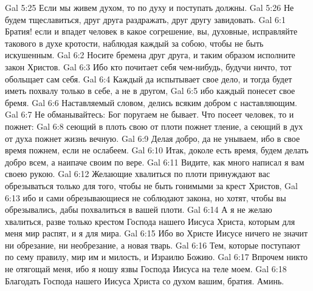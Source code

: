 Gal 5:25  Если мы живем духом, то по духу и поступать должны.
Gal 5:26  Не будем тщеславиться, друг друга раздражать, друг другу завидовать.
Gal 6:1  Братия! если и впадет человек в какое согрешение, вы, духовные, исправляйте такового в духе кротости, наблюдая каждый за собою, чтобы не быть искушенным.
Gal 6:2  Носите бремена друг друга, и таким образом исполните закон Христов.
Gal 6:3  Ибо кто почитает себя чем-нибудь, будучи ничто, тот обольщает сам себя.
Gal 6:4  Каждый да испытывает свое дело, и тогда будет иметь похвалу только в себе, а не в другом,
Gal 6:5  ибо каждый понесет свое бремя.
Gal 6:6  Наставляемый словом, делись всяким добром с наставляющим.
Gal 6:7  Не обманывайтесь: Бог поругаем не бывает. Что посеет человек, то и пожнет:
Gal 6:8  сеющий в плоть свою от плоти пожнет тление, а сеющий в дух от духа пожнет жизнь вечную.
Gal 6:9  Делая добро, да не унываем, ибо в свое время пожнем, если не ослабеем.
Gal 6:10  Итак, доколе есть время, будем делать добро всем, а наипаче своим по вере.
Gal 6:11  Видите, как много написал я вам своею рукою.
Gal 6:12  Желающие хвалиться по плоти принуждают вас обрезываться только для того, чтобы не быть гонимыми за крест Христов,
Gal 6:13  ибо и сами обрезывающиеся не соблюдают закона, но хотят, чтобы вы обрезывались, дабы похвалиться в вашей плоти.
Gal 6:14  А я не желаю хвалиться, разве только крестом Господа нашего Иисуса Христа, которым для меня мир распят, и я для мира.
Gal 6:15  Ибо во Христе Иисусе ничего не значит ни обрезание, ни необрезание, а новая тварь.
Gal 6:16  Тем, которые поступают по сему правилу, мир им и милость, и Израилю Божию.
Gal 6:17  Впрочем никто не отягощай меня, ибо я ношу язвы Господа Иисуса на теле моем.
Gal 6:18  Благодать Господа нашего Иисуса Христа со духом вашим, братия. Аминь.


